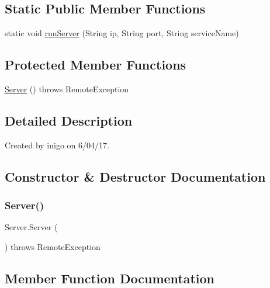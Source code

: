 \subsection*{Static Public Member Functions}
\begin{DoxyCompactItemize}
\item 
static void \hyperlink{class_server_af25f1267d05a10696368d856a11328e1}{run\+Server} (String ip, String port, String service\+Name)
\end{DoxyCompactItemize}
\subsection*{Protected Member Functions}
\begin{DoxyCompactItemize}
\item 
\hyperlink{class_server_a0523b403c83475114d3be0143f3321ad}{Server} ()  throws Remote\+Exception 
\end{DoxyCompactItemize}


\subsection{Detailed Description}
Created by inigo on 6/04/17. 

\subsection{Constructor \& Destructor Documentation}
\mbox{\label{class_server_a0523b403c83475114d3be0143f3321ad}} 
\subsubsection{\texorpdfstring{Server()}{Server()}}
{\footnotesize\ttfamily Server.\+Server (\begin{DoxyParamCaption}{ }\end{DoxyParamCaption}) throws Remote\+Exception\hspace{0.3cm}{\ttfamily [protected]}}



\subsection{Member Function Documentation}
\mbox{\label{class_server_ad679fc8c7704690482684e42cc15c740}} 
